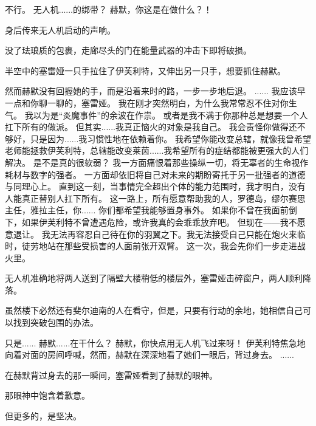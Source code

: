 \documentclass[openany]{book}
\begin{document}
\begin{dialogue}
     不行。
     无人机......的绑带？
     赫默，你这是在做什么？！\par
    身后传来无人机启动的声响。\par
    没了珐琅质的包裹，走廊尽头的门在能量武器的冲击下即将破损。\par
    半空中的塞雷娅一只手拉住了伊芙利特，又伸出另一只手，想要抓住赫默。\par
    然而赫默没有回握她的手，而是沿着来时的路，一步一步地后退。
     ......
     我应该早一点和你聊一聊的，塞雷娅。
     我在刚才突然明白，为什么我常常忍不住对你生气。
     我以为是“炎魔事件”的余波在作祟。
     或者是我不满于你那种总是想要一个人扛下所有的做派。
     但其实......我真正恼火的对象是我自己。
     我会责怪你做得还不够好，只是因为......我习惯性地在依赖着你。
     我希望你能改变总辖，就像我曾希望老师能拯救伊芙利特，总辖能改变莱茵......我希望所有的症结都能被更强大的人们解决。
     是不是真的很软弱？
     我一方面痛恨着那些操纵一切，将无辜者的生命视作耗材与数字的强者。
     一方面却依旧将自己对未来的期盼寄托于另一批强者的道德与同理心上。
     直到这一刻，当事情完全超出个体的能力范围时，我才明白，没有人能真正替别人扛下所有。
     这一路上，所有愿意帮助我的人，罗德岛，缪尔赛思主任，雅拉主任，你......
     你们都希望我能够置身事外。
     如果你不曾在我面前倒下，如果伊芙利特不曾遭遇危险，或许我真的会乖乖放弃吧。
     但现在——我不愿意退让。
     我无法再容忍自己待在你的羽翼之下。我无法接受自己只能在炮火来临时，徒劳地站在那些受损害的人面前张开双臂。
     这一次，我会先你们一步走进战火里。\par
    无人机准确地将两人送到了隔壁大楼稍低的楼层外，塞雷娅击碎窗户，两人顺利降落。\par
    虽然楼下必然还有斐尔迪南的人在看守，但是，只要有行动的余地，她相信自己可以找到突破包围的办法。\par
    只是......
     赫默......在干什么？
     赫默，你快点用无人机飞过来呀！
    伊芙利特焦急地向着对面的房间呼喊，然而，赫默在深深地看了她们一眼后，背过身去。
     ......
\end{dialogue}\par

在赫默背过身去的那一瞬间，塞雷娅看到了赫默的眼神。\par
那眼神中饱含着歉意。\par
但更多的，是坚决。
\end{document}

